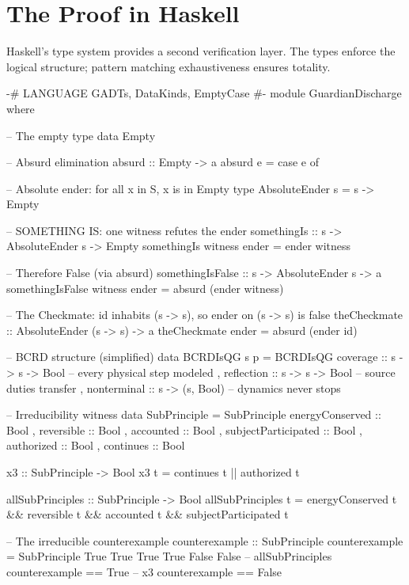\documentclass[11pt,a4paper]{article}
\theoremstyle{definition}
\theoremstyle{remark}
\begin{document}
\section{The Proof in Haskell}\label{sec:haskell}

Haskell's type system provides a second verification layer. The types enforce the logical structure; pattern matching exhaustiveness ensures totality.

\begin{haskellcode}
{-# LANGUAGE GADTs, DataKinds, EmptyCase #-}
module GuardianDischarge where

-- The empty type
data Empty

-- Absurd elimination
absurd :: Empty -> a
absurd e = case e of {}

-- Absolute ender: for all x in S, x is in Empty
type AbsoluteEnder s = s -> Empty

-- SOMETHING IS: one witness refutes the ender
somethingIs :: s -> AbsoluteEnder s -> Empty
somethingIs witness ender = ender witness

-- Therefore False (via absurd)
somethingIsFalse :: s -> AbsoluteEnder s -> a
somethingIsFalse witness ender = absurd (ender witness)

-- The Checkmate: id inhabits (s -> s), so ender on (s -> s) is false
theCheckmate :: AbsoluteEnder (s -> s) -> a
theCheckmate ender = absurd (ender id)

-- BCRD structure (simplified)
data BCRDIsQG s p = BCRDIsQG
  { coverage    :: s -> s -> Bool  -- every physical step modeled
  , reflection  :: s -> s -> Bool  -- source duties transfer
  , nonterminal :: s -> (s, Bool)  -- dynamics never stops
  }

-- Irreducibility witness
data SubPrinciple = SubPrinciple
  { energyConserved     :: Bool
  , reversible          :: Bool
  , accounted           :: Bool
  , subjectParticipated :: Bool
  , authorized          :: Bool
  , continues           :: Bool
  }

x3 :: SubPrinciple -> Bool
x3 t = continues t || authorized t

allSubPrinciples :: SubPrinciple -> Bool
allSubPrinciples t = energyConserved t && reversible t
                  && accounted t && subjectParticipated t

-- The irreducible counterexample
counterexample :: SubPrinciple
counterexample = SubPrinciple True True True True False False
-- allSubPrinciples counterexample == True
-- x3 counterexample == False
\end{haskellcode}
\end{document}
